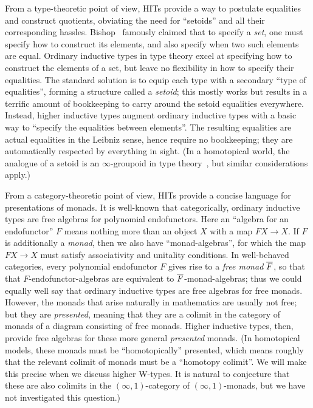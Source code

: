 \documentclass{amsart}
\begin{document}
From a type-theoretic point of view, HITs provide a way to postulate equalities and construct quotients, obviating the need for ``setoids'' and all their corresponding hassles.
Bishop~\cite{bishop:fca} famously claimed that to specify a \emph{set}, one must specify how to construct its elements, and also specify when two such elements are equal.
Ordinary inductive types in type theory excel at specifying how to construct the elements of a set, but leave no flexibility in how to specify their equalities.
The standard solution is to equip each type with a secondary ``type of equalities'', forming a structure called a \emph{setoid}; this mostly works but results in a terrific amount of bookkeeping to carry around the setoid equalities everywhere.
Instead, higher inductive types augment ordinary inductive types with a basic way to ``specify the equalities between elements''.
The resulting equalities are actual equalities in the Leibniz sense, hence require no bookkeeping; they are automatically respected by everything in sight.
(In a homotopical world, the analogue of a setoid is an $\infty$-groupoid in type theory~\cite{coquand...}, but similar considerations apply.)

From a category-theoretic point of view, HITs provide a concise language for presentations of monads.
It is well-known that categorically, ordinary inductive types are free algebras for polynomial endofunctors.
Here an ``algebra for an endofunctor'' $F$ means nothing more than an object $X$ with a map $FX \to X$.
If $F$ is additionally a \emph{monad}, then we also have ``monad-algebras'', for which the map $FX \to X$ must satisfy associativity and unitality conditions.
In well-behaved categories, every polynomial endofunctor $F$ gives rise to a \emph{free monad} $\overline{F}$, so that that $F$-endofunctor-algebras are equivalent to $\overline{F}$-monad-algebras; thus we could equally well say that ordinary inductive types are free algebras for free monads.
However, the monads that arise naturally in mathematics are usually not free; but they are \emph{presented}, meaning that they are a colimit in the category of monads of a diagram consisting of free monads.
Higher inductive types, then, provide free algebras for these more general \emph{presented} monads.
(In homotopical models, these monads must be ``homotopically'' presented, which means roughly that the relevant colimit of monads must be a ``homotopy colimit''.
We will make this precise when we discuss higher W-types.
It is natural to conjecture that these are also colimits in the $(\infty,1)$-category of $(\infty,1)$-monads, but we have not investigated this question.)
\end{document}
